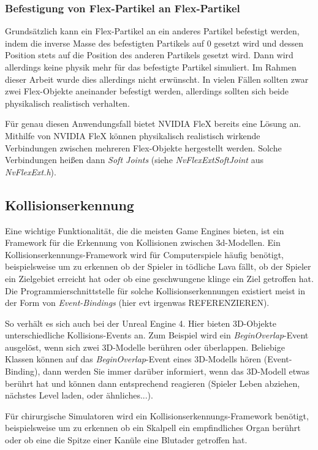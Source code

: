 \subsubsection{Befestigung von Flex-Partikel an Flex-Partikel}

Grundsätzlich kann ein Flex-Partikel an ein anderes Partikel befestigt werden, indem die inverse Masse des befestigten Partikels auf 0 gesetzt wird und dessen Position stets auf die Position des anderen Partikels gesetzt wird. Dann wird allerdings keine physik mehr für das befestigte Partikel simuliert. Im Rahmen dieser Arbeit wurde dies allerdings nicht erwünscht. In vielen Fällen sollten zwar zwei Flex-Objekte aneinander befestigt werden, allerdings sollten sich beide physikalisch realistisch verhalten. 

Für genau diesen Anwendungsfall bietet NVIDIA FleX bereits eine Lösung an. Mithilfe von NVIDIA FleX können physikalisch realistisch wirkende Verbindungen zwischen mehreren Flex-Objekte hergestellt werden. Solche Verbindungen heißen dann \textit{Soft Joints} (siehe \textit{NvFlexExtSoftJoint} aus \textit{NvFlexExt.h}).

\subsection{Kollisionserkennung}


Eine wichtige Funktionalität, die die meisten Game Engines bieten, ist ein Framework für die Erkennung von Kollisionen zwischen 3d-Modellen. 
Ein Kollisionserkennungs-Framework wird für Computerspiele häufig benötigt, beispielsweise um zu erkennen ob der Spieler in tödliche Lava fällt, ob der Spieler ein Zielgebiet erreicht hat oder ob eine geschwungene klinge ein Ziel getroffen hat. Die Programmierschnittstelle für solche Kollisionserkennungen existiert meist in der Form von \textit{Event-Bindings} (hier evt irgenwas REFERENZIEREN). 

So verhält es sich auch bei der Unreal Engine 4. Hier bieten 3D-Objekte unterschiedliche Kollisions-Events an. Zum Beispiel wird ein \textit{BeginOverlap}-Event ausgelöst, wenn sich zwei 3D-Modelle berühren oder überlappen. Beliebige Klassen können auf das \textit{BeginOverlap}-Event eines 3D-Modells hören (Event-Binding), dann werden Sie immer darüber informiert, wenn das 3D-Modell etwas berührt hat und können dann entsprechend reagieren (Spieler Leben abziehen, nächstes Level laden, oder ähnliches...).

Für chirurgische Simulatoren wird ein Kollisionserkennungs-Framework benötigt, beispielsweise um zu erkennen ob ein Skalpell ein empfindliches Organ berührt oder ob eine die Spitze einer Kanüle eine Blutader getroffen hat.

